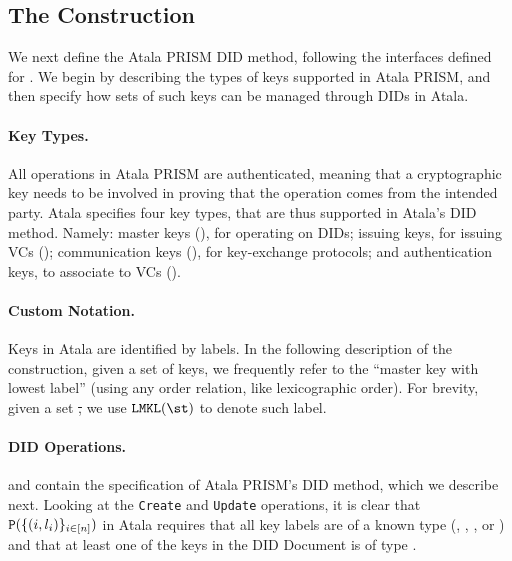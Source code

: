 \subsection{The \RealPKIDIDAtala Construction}

We next define the Atala PRISM DID method, following the interfaces defined for
\IdealFPKIDID. We begin by describing the types of keys supported in Atala
PRISM, and then specify how sets of such keys can be managed through DIDs in
Atala.

\paragraph{Key Types.} %
All operations in Atala PRISM are authenticated, meaning that a cryptographic
key needs to be involved in proving that the operation comes from the intended
party. Atala specifies four key types, that are thus supported in Atala's DID
method. Namely: master keys (\MasterKey), for operating on DIDs; issuing keys,
for issuing VCs (\IssueKey); communication keys (\CommKey), for key-exchange
protocols; and authentication keys, to associate to VCs (\AuthKey).

\paragraph{Custom Notation.} %
Keys in Atala are identified by labels. In the following description of the
\RealPKIDIDAtala construction, given a set of keys, we frequently refer to the
``master key with lowest label'' (using any order relation, like lexicographic
order).  For brevity, given a set \st, we use $\LMKL(\st)$ to denote such label.

\paragraph{DID Operations.} %
 and  contain the
specification of Atala PRISM's DID method,
which we describe next. Looking at the \texttt{Create} and \texttt{Update}
operations, it is clear that $\mathtt{P}(\lbrace (i, l_i) \rbrace_{i\in[n]})$ in
Atala requires that all key labels are of a known type (\MasterKey, \IssueKey,
\CommKey, or \AuthKey) and that at least one of the keys in the DID Document
is of type \MasterKey.

